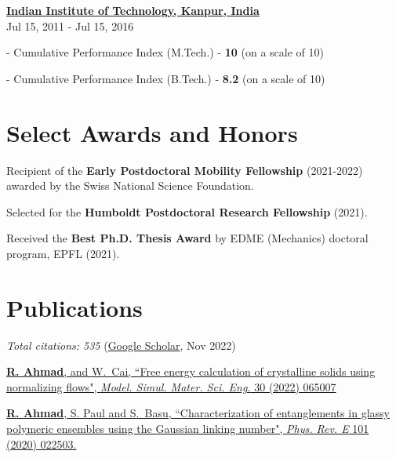\documentclass[margin,line]{resume}
\begin{document}
\begin{resume}
    \textbf{\href{http://www.iitk.ac.in/}{\textsf{Indian Institute of Technology, Kanpur, India}}}\vspace{0mm}\\
     \hfill \small{Jul 15, 2011 - Jul 15, 2016}
    \vspace{-3mm}
    \begin{compactitem}
        \item[-] {Cumulative Performance Index (M.Tech.) - \textbf{10} (on a scale of 10)}
        \item[-] {Cumulative Performance Index (B.Tech.) - \textbf{8.2} (on a scale of 10)}
    \end{compactitem}%

    \section{\mysidestyle Select Awards and Honors}  \vspace{0mm}

    Recipient of the \textbf{Early Postdoctoral Mobility Fellowship} (2021-2022) awarded by the Swiss National Science Foundation.

    \vspace{-0.3cm}
    Selected for the \textbf{Humboldt Postdoctoral Research Fellowship} (2021).

    \vspace{-0.3cm}
    Received the \textbf{Best Ph.D. Thesis Award} by EDME (Mechanics) doctoral program, EPFL (2021).

    \section{\mysidestyle Publications}
    \small{\textit{Total citations: 535} (\href{https://scholar.google.ch/citations?user=ujjgd08AAAAJ&hl=en}{Google Scholar}, Nov 2022)}

    \href{https://iopscience.iop.org/article/10.1088/1361-651X/ac7f4b} {\textbf{R. Ahmad}, and W.~Cai, ``Free energy calculation of crystalline solids using normalizing flows", \textit{Model. Simul. Mater. Sci. Eng.} 30 (2022) 065007}

    \href{https://journals.aps.org/pre/abstract/10.1103/PhysRevE.101.022503} {\textbf{R. Ahmad}, S. Paul and S.~Basu, ``Characterization of entanglements in glassy polymeric ensembles using the Gaussian linking number", \textit{Phys. Rev. E} 101 (2020) 022503.}


\end{resume}
\end{document}
